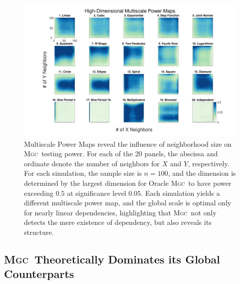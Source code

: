 \documentclass[11pt]{article}
\providecommand{\sct}[1]{{\normalfont\textsc{#1}}}
\newcommand{\Mgc}{\sct{Mgc}}
\begin{document}
\begin{figure}[htbp]
\includegraphics[width=1.0\textwidth]{Figures/FigHDHeat}
\caption{Multiscale Power Maps reveal the influence of neighborhood size on \Mgc~testing power.
For each of the 20 panels, the abscissa and ordinate denote the number of neighbors for $X$ and  $Y$, respectively. For each simulation, the sample size is $n=100$,  and the dimension is determined by the largest dimension for Oracle \Mgc~to have power exceeding $0.5$ at significance level  $0.05$. Each simulation yields a different multiscale power map, and the global scale is optimal only for nearly linear dependencies, highlighting that \Mgc~not only detects the mere existence of dependency, but also reveals its  structure.}
\label{f:powermaps}
\end{figure}


\subsection*{\Mgc~Theoretically Dominates its Global Counterparts}
\label{s:theory}
\end{document}
